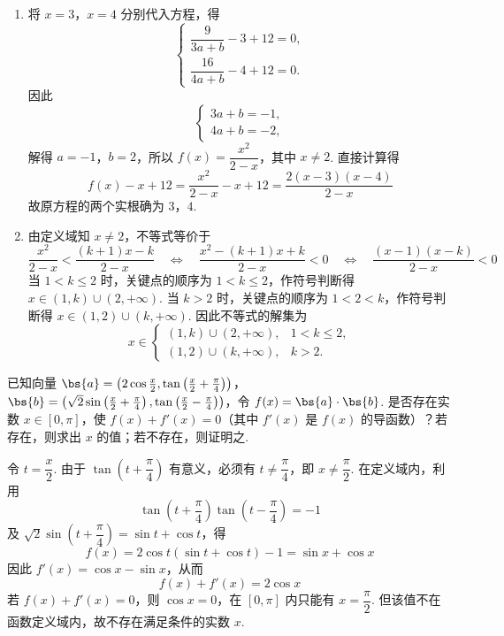 \begin{solution}
\begin{enumerate}
\item 将 \(x=3\)，\(x=4\) 分别代入方程，得
\[
\begin{cases}
\dfrac{9}{3a+b}-3+12=0,\\
\dfrac{16}{4a+b}-4+12=0.
\end{cases}
\]
因此
\[
\begin{cases}
3a+b=-1,\\
4a+b=-2,
\end{cases}
\]
解得 \(a=-1\)，\(b=2\)，所以 \(f(x)=\dfrac{x^{2}}{2-x}\)，其中 \(x\ne2\). 直接计算得
\[
f(x)-x+12=\frac{x^{2}}{2-x}-x+12=\frac{2(x-3)(x-4)}{2-x}
\]
故原方程的两个实根确为 \(3\)，\(4\).

\item 由定义域知 \(x\ne2\)，不等式等价于
\[
\frac{x^{2}}{2-x}<\frac{(k+1)x-k}{2-x}
\quad\Longleftrightarrow\quad
\frac{x^{2}-(k+1)x+k}{2-x}<0
\quad\Longleftrightarrow\quad
\frac{(x-1)(x-k)}{2-x}<0
\]
当 \(1<k\leqslant2\) 时，关键点的顺序为 \(1<k\leqslant2\)，作符号判断得 \(x\in(1,k)\cup(2,+\infty)\). 当 \(k>2\) 时，关键点的顺序为 \(1<2<k\)，作符号判断得 \(x\in(1,2)\cup(k,+\infty)\). 因此不等式的解集为
\[
x\in
\begin{cases}
(1,k)\cup(2,+\infty),&1<k\leqslant2,\\
(1,2)\cup(k,+\infty),&k>2.
\end{cases}
\]
\end{enumerate}
\end{solution}

\begin{problem}
已知向量 \(\bs{a}=\left(2\cos\frac{x}{2},\tan\left(\frac{x}{2}+\frac{\pi}{4}\right)\right)\)，\(\bs{b}=\left(\sqrt{2}\sin\left(\frac{x}{2}+\frac{\pi}{4}\right),\tan\left(\frac{x}{2}-\frac{\pi}{4}\right)\right)\)，令 \(f(x)=\bs{a}\cdot\bs{b}\). 是否存在实数 \(x\in[0,\pi]\)，使 \(f(x)+f'(x)=0\)（其中 \(f'(x)\) 是 \(f(x)\) 的导函数）？若存在，则求出 \(x\) 的值；若不存在，则证明之.
\end{problem}

\begin{solution}
令 \(t=\dfrac{x}{2}\). 由于 \(\tan\left(t+\dfrac{\pi}{4}\right)\) 有意义，必须有 \(t\ne\dfrac{\pi}{4}\)，即 \(x\ne\dfrac{\pi}{2}\). 在定义域内，利用
\[
\tan\left(t+\frac{\pi}{4}\right)\tan\left(t-\frac{\pi}{4}\right)=-1
\]
及 \(\sqrt{2}\sin\left(t+\dfrac{\pi}{4}\right)=\sin t+\cos t\)，得
\[
f(x)=2\cos t\left(\sin t+\cos t\right)-1=\sin x+\cos x
\]
因此 \(f'(x)=\cos x-\sin x\)，从而
\[
f(x)+f'(x)=2\cos x
\]
若 \(f(x)+f'(x)=0\)，则 \(\cos x=0\)，在 \([0,\pi]\) 内只能有 \(x=\dfrac{\pi}{2}\). 但该值不在函数定义域内，故不存在满足条件的实数 \(x\).
\end{solution}

